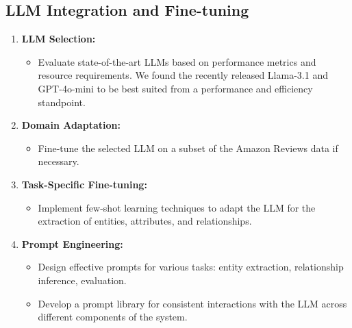 \documentclass{article}
\begin{document}

\subsection{LLM Integration and Fine-tuning}
\begin{enumerate}
      \item \textbf{LLM Selection:}
            \begin{itemize}
                  \item Evaluate state-of-the-art LLMs 
                        based on
                        performance metrics and resource requirements. We found
                        the
                        recently released Llama-3.1 and GPT-4o-mini to be best suited from a performance and efficiency standpoint.
            \end{itemize}

      \item \textbf{Domain Adaptation:}
            \begin{itemize}
                  \item Fine-tune the selected LLM on a subset of the Amazon
                        Reviews data
                        if necessary.
            \end{itemize}

      \item \textbf{Task-Specific Fine-tuning:}
            \begin{itemize}
                  \item Implement few-shot learning techniques to adapt the LLM
                        for the extraction of entities, attributes, and
                        relationships.
                        
            \end{itemize}

      \item \textbf{Prompt Engineering:}
            \begin{itemize}
                  \item Design effective prompts for various tasks: entity
                        extraction,
                        relationship inference, evaluation.
                  \item Develop a prompt library for consistent interactions
                        with
                        the LLM
                        across different components of the system.
            \end{itemize}
\end{enumerate}
\end{document}
